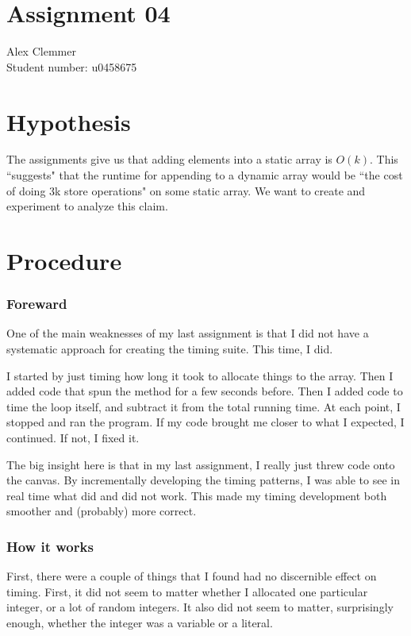 \documentclass[a4paper]{article}
\begin{document}
\section*{Assignment 04}
Alex Clemmer\\
Student number: u0458675

\section*{Hypothesis}

The assignments give us that adding elements into a static array is $O(k)$. This ``suggests" that the runtime for appending to a dynamic array would be ``the cost of doing 3k store operations" on some static array. We want to create and experiment to analyze this claim.

\section*{Procedure}

\subsubsection*{Foreward} One of the main weaknesses of my last assignment is that I did not have a systematic approach for creating the timing suite. This time, I did.

I started by just timing how long it took to allocate things to the array. Then I added code that spun the method for a few seconds before. Then I added code to time the loop itself, and subtract it from the total running time. At each point, I stopped and ran the program. If my code brought me closer to what I expected, I continued. If not, I fixed it.

The big insight here is that in my last assignment, I really just threw code onto the canvas. By incrementally developing the timing patterns, I was able to see in real time what did and did not work. This made my timing development both smoother and (probably) more correct.

\subsubsection*{How it works}

First, there were a couple of things that I found had no discernible effect on timing. First, it did not seem to matter whether I allocated one particular integer, or a lot of random integers. It also did not seem to matter, surprisingly enough, whether the integer was a variable or a literal.
\end{document}
